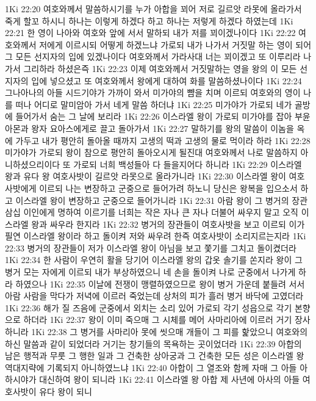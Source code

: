 1Ki 22:20  여호와께서 말씀하시기를 누가 아합을 꾀어 저로 길르앗 라못에 올라가서 죽게 할꼬 하시니 하나는 이렇게 하겠다 하고 하나는 저렇게 하겠다 하였는데
1Ki 22:21  한 영이 나아와 여호와 앞에 서서 말하되 내가 저를 꾀이겠나이다
1Ki 22:22  여호와께서 저에게 이르시되 어떻게 하겠느냐 가로되 내가 나가서 거짓말 하는 영이 되어 그 모든 선지자의 입에 있겠나이다 여호와께서 가라사대 너는 꾀이겠고 또 이루리라 나가서 그리하라 하셨은즉
1Ki 22:23  이제 여호와께서 거짓말하는 영을 왕의 이 모든 선지자의 입에 넣으셨고 또 여호와께서 왕에게 대하여 화를 말씀하셨나이다
1Ki 22:24  그나아나의 아들 시드기야가 가까이 와서 미가야의 뺨을 치며 이르되 여호와의 영이 나를 떠나 어디로 말미암아 가서 네게 말씀 하더냐
1Ki 22:25  미가야가 가로되 네가 골방에 들어가서 숨는 그 날에 보리라
1Ki 22:26  이스라엘 왕이 가로되 미가야를 잡아 부윤 아몬과 왕자 요아스에게로 끌고 돌아가서
1Ki 22:27  말하기를 왕의 말씀이 이놈을 옥에 가두고 내가 평안히 돌아올 때까지 고생의 떡과 고생의 물로 먹이라 하라
1Ki 22:28  미가야가 가로되 왕이 참으로 평안히 돌아오시게 될진대 여호와께서 나로 말씀하지 아니하셨으리이다 또 가로되 너희 백성들아 다 들을지어다 하니라
1Ki 22:29  이스라엘 왕과 유다 왕 여호사밧이 길르앗 라못으로 올라가니라
1Ki 22:30  이스라엘 왕이 여호사밧에게 이르되 나는 변장하고 군중으로 들어가려 하노니 당신은 왕복을 입으소서 하고 이스라엘 왕이 변장하고 군중으로 들어가니라
1Ki 22:31  아람 왕이 그 병거의 장관 삼십 이인에게 명하여 이르기를 너희는 작은 자나 큰 자나 더불어 싸우지 말고 오직 이스라엘 왕과 싸우라 한지라
1Ki 22:32  병거의 장관들이 여호사밧을 보고 이르되 이가 필연 이스라엘 왕이라 하고 돌이켜 저와 싸우려 한즉 여호사밧이 소리지르는지라
1Ki 22:33  병거의 장관들이 저가 이스라엘 왕이 아님을 보고 쫓기를 그치고 돌이켰더라
1Ki 22:34  한 사람이 우연히 활을 당기어 이스라엘 왕의 갑옷 솔기를 쏜지라 왕이 그 병거 모는 자에게 이르되 내가 부상하였으니 네 손을 돌이켜 나로 군중에서 나가게 하라 하였으나
1Ki 22:35  이날에 전쟁이 맹렬하였으므로 왕이 병거 가운데 붙들려 서서 아람 사람을 막다가 저녁에 이르러 죽었는데 상처의 피가 흘러 병거 바닥에 고였더라
1Ki 22:36  해가 질 즈음에 군중에서 외치는 소리 있어 가로되 각기 성읍으로 각기 본향으로 하더라
1Ki 22:37  왕이 이미 죽으매 그 시체를 메어 사마리아에 이르러 거기 장사 하니라
1Ki 22:38  그 병거를 사마리아 못에 씻으매 개들이 그 피를 핥았으니 여호와의 하신 말씀과 같이 되었더라 거기는 창기들의 목욕하는 곳이었더라
1Ki 22:39  아합의 남은 행적과 무룻 그 행한 일과 그 건축한 상아궁과 그 건축한 모든 성은 이스라엘 왕 역대지략에 기록되지 아니하였느냐
1Ki 22:40  아합이 그 열조와 함께 자매 그 아들 아하시야가 대신하여 왕이 되니라
1Ki 22:41  이스라엘 왕 아합 제 사년에 아사의 아들 여호사밧이 유다 왕이 되니
